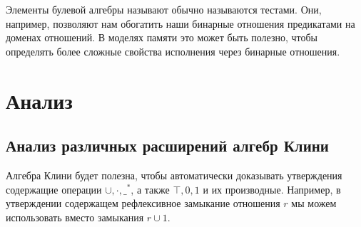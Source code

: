 \documentclass[times
              ]{itmo-student-thesis}
\begin{document}
      Элементы булевой алгебры называют обычно называются тестами. Они, например, позволяют нам обогатить наши бинарные отношения предикатами на доменах отношений.
      В моделях памяти это может быть полезно, чтобы определять более сложные свойства исполнения через бинарные отношения.



  \section{Анализ}



  \subsection{Анализ различных расширений алгебр Клини}
    Алгебра Клини будет полезна, чтобы автоматически доказывать утверждения содержащие операции $ \cup, \cdot, \_^* $, а также $ \top, 0, 1 $ и их производные. Например, в утверждении содержащем рефлексивное замыкание отношения $ r $ мы можем использовать вместо замыкания $ r \cup 1 $.
\end{document}
